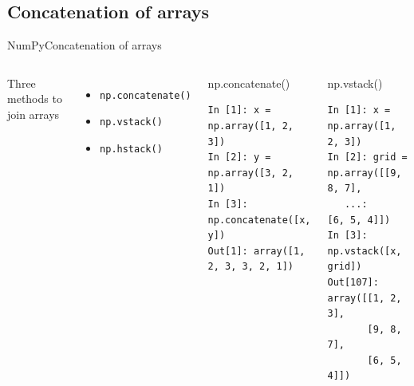 \documentclass[10pt,compress]{beamer} %
\begin{document}
\subsection{Concatenation of arrays}
\begin{frame}[fragile]{NumPy}{Concatenation of arrays}
	\begin{columns}
		Three methods to join arrays
		\begin{itemize}
			\item \texttt{np.concatenate()}
			\item \texttt{np.vstack()}
			\item \texttt{np.hstack()}
		\end{itemize}

		\begin{exampleblock}{\footnotesize{np.concatenate()}}
		\vspace{-0.2cm} 
			\begin{lstlisting}
In [1]: x = np.array([1, 2, 3])
In [2]: y = np.array([3, 2, 1])
In [3]: np.concatenate([x, y])
Out[1]: array([1, 2, 3, 3, 2, 1])
			\end{lstlisting}
		\vspace{-0.2cm} 
		\end{exampleblock}

		\begin{exampleblock}{\footnotesize{np.vstack()}}
		\vspace{-0.2cm} 
			\begin{lstlisting}
In [1]: x = np.array([1, 2, 3])
In [2]: grid = np.array([[9, 8, 7],
   ...:                  [6, 5, 4]])
In [3]: np.vstack([x, grid])
Out[107]: 
array([[1, 2, 3],
       [9, 8, 7],
       [6, 5, 4]])
			\end{lstlisting}
		\vspace{-0.2cm} 
		\end{exampleblock}
	\end{columns}
\end{frame}
\end{document}

